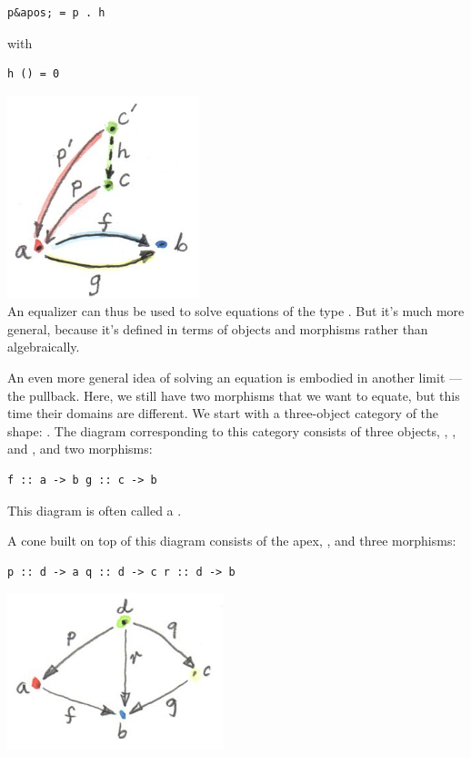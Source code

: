\begin{verbatim}
p&apos; = p . h
\end{verbatim}

with

\begin{verbatim}
h () = 0
\end{verbatim}

\includegraphics[width=2.19792in]{images/equilizerlimit.jpg}\\
An equalizer can thus be used to solve equations of the type
. But it's much more general, because it's defined
in terms of objects and morphisms rather than algebraically.

An even more general idea of solving an equation is embodied in another
limit --- the pullback. Here, we still have two morphisms that we want
to equate, but this time their domains are different. We start with a
three-object category of the shape:
. The diagram corresponding to
this category consists of three objects, , , and
, and two morphisms:

\begin{verbatim}
f :: a -> b g :: c -> b
\end{verbatim}

This diagram is often called a .

A cone built on top of this diagram consists of the apex, ,
and three morphisms:

\begin{verbatim}
p :: d -> a q :: d -> c r :: d -> b
\end{verbatim}

\includegraphics[width=2.47917in]{images/pullbackcone.jpg}

